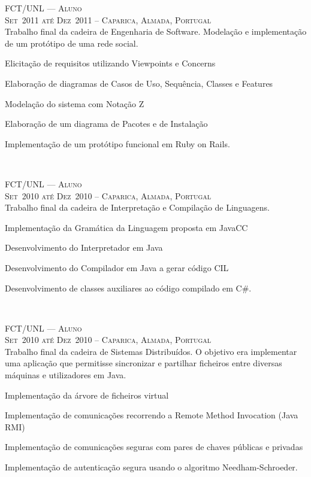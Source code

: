 \documentclass[a4paper,fontsize=10pt]{scrartcl} %
\begin{document}
\begin{minipage}[t]{0.5\textwidth}
\textsc{FCT/UNL --- Aluno}\\
\small\textsc{Set~2011 até Dez~2011 -- Caparica, Almada, Portugal}\\ \normalsize
Trabalho final da cadeira de Engenharia de Software.
Modelação e implementação de um protótipo de uma rede social.\\
\begin{inparaitem} 
	\item[] Elicitação de requisitos utilizando Viewpoints e Concerns
	\item Elaboração de diagramas de Casos de Uso, Sequência, Classes e Features 
	\item Modelação do sistema com Notação Z
	\item Elaboração de um diagrama de Pacotes e de Instalação
	\item Implementação de um protótipo funcional em Ruby on Rails.
\end{inparaitem}
\\\par

\textsc{FCT/UNL --- Aluno}\\
\small\textsc{Set~2010 até Dez~2010 -- Caparica, Almada, Portugal}\\ \normalsize
Trabalho final da cadeira de Interpretação e Compilação de Linguagens.\\
\begin{inparaitem} 
	\item[] Implementação da Gramática da Linguagem proposta em JavaCC
	\item Desenvolvimento do Interpretador em Java
	\item Desenvolvimento do Compilador em Java a gerar código CIL
	\item Desenvolvimento de classes auxiliares ao código compilado em C\#.
\end{inparaitem}
\\\par

\textsc{FCT/UNL --- Aluno}\\
\small\textsc{Set~2010 até Dez~2010 -- Caparica, Almada, Portugal}\\ \normalsize
Trabalho final da cadeira de Sistemas Distribuídos.
O objetivo era implementar uma aplicação que permitisse sincronizar e partilhar ficheiros entre diversas máquinas e utilizadores em Java.\\
\begin{inparaitem} 
	\item[] Implementação da árvore de ficheiros virtual
	\item Implementação de comunicações recorrendo a Remote Method Invocation (Java RMI)
	\item Implementação de comunicações seguras com pares de chaves públicas e privadas
	\item Implementação de autenticação segura usando o algoritmo Needham-Schroeder.
\end{inparaitem}
\\\par


\end{minipage}
\end{document}
